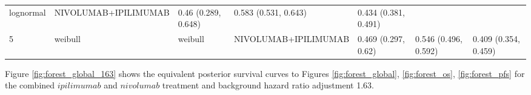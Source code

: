 \documentclass[
]{article}
\begin{document}
\begin{longtable}[]{@{}lllllll@{}}
\begin{minipage}[t]{0.09\columnwidth}
lognormal\strut
\end{minipage} & \begin{minipage}[t]{0.15\columnwidth}\raggedright
NIVOLUMAB+IPILIMUMAB\strut
\end{minipage} & \begin{minipage}[t]{0.15\columnwidth}\raggedright
0.46 (0.289, 0.648)\strut
\end{minipage} & \begin{minipage}[t]{0.15\columnwidth}\raggedright
0.583 (0.531, 0.643)\strut
\end{minipage} & \begin{minipage}[t]{0.15\columnwidth}\raggedright
0.434 (0.381, 0.491)\strut
\end{minipage}\tabularnewline
\begin{minipage}[t]{0.02\columnwidth}\raggedright
5\strut
\end{minipage} & \begin{minipage}[t]{0.09\columnwidth}\raggedright
weibull\strut
\end{minipage} & \begin{minipage}[t]{0.09\columnwidth}\raggedright
weibull\strut
\end{minipage} & \begin{minipage}[t]{0.15\columnwidth}\raggedright
NIVOLUMAB+IPILIMUMAB\strut
\end{minipage} & \begin{minipage}[t]{0.15\columnwidth}\raggedright
0.469 (0.297, 0.62)\strut
\end{minipage} & \begin{minipage}[t]{0.15\columnwidth}\raggedright
0.546 (0.496, 0.592)\strut
\end{minipage} & \begin{minipage}[t]{0.15\columnwidth}\raggedright
0.409 (0.354, 0.459)\strut
\end{minipage}\tabularnewline
\bottomrule
\end{longtable}

Figure \ref{fig:forest_global_163} shows the equivalent posterior
survival curves to Figures \ref{fig:forest_global}, \ref{fig:forest_os},
\ref{fig:forest_pfs} for the combined \(ipilimumab\) and \(nivolumab\)
treatment and background hazard ratio adjustment 1.63.
\end{document}
